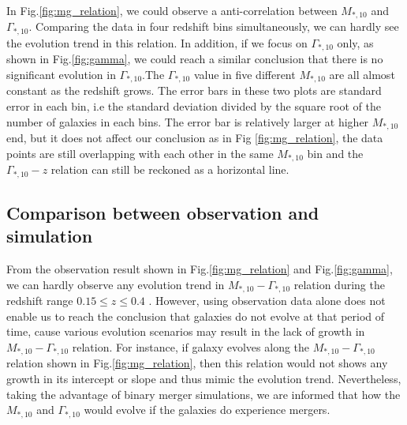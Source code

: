\documentclass[fleqn,usenatbib]{mnras}
\begin{document}
\par In Fig.\ref{fig:mg_relation}, we could observe a anti-correlation between $M_{*,10}$ and $\Gamma_{*,10}$. Comparing the data in four redshift bins simultaneously, we can hardly see the evolution trend in this relation. In addition, if we focus on $\Gamma_{*,10}$ only, as shown in Fig.\ref{fig:gamma}, we could reach a similar conclusion that there is no significant evolution in $\Gamma_{*,10}$.The $\Gamma_{*,10}$ value in five different $M_{*,10}$ are all almost constant as the redshift grows. The error bars in these two plots are standard error in each bin, i.e the standard deviation divided by the square root of the number of galaxies in each bins. The error bar is relatively larger at higher $M_{*,10}$ end, but it does not affect our conclusion as in Fig \ref{fig:mg_relation}, the data points are still overlapping with each other in the same $M_{*,10}$ bin and the $\Gamma_{*,10} - z$ relation can still be reckoned as a horizontal line. 
\subsection{Comparison between observation and simulation}
\par From the observation result shown in Fig.\ref{fig:mg_relation} and Fig.\ref{fig:gamma}, we can hardly observe any evolution trend in $M_{*,10} - \Gamma_{*,10}$ relation during the redshift range $ 0.15 \leq z \leq 0.4$ . However, using observation data alone does not enable us to reach the conclusion that galaxies do not evolve at that period of time, cause various evolution scenarios may result in the lack of growth in $M_{*,10} - \Gamma_{*,10}$ relation. For instance, if galaxy evolves along the $M_{*,10} - \Gamma_{*,10}$ relation shown in Fig.\ref{fig:mg_relation}, then this relation would not shows any growth in its intercept or slope and thus mimic the evolution trend. Nevertheless, taking the advantage of binary merger simulations, we are informed that how the $M_{*,10} $ and $\Gamma_{*,10}$ would evolve if the galaxies do experience mergers. 


\end{document}
